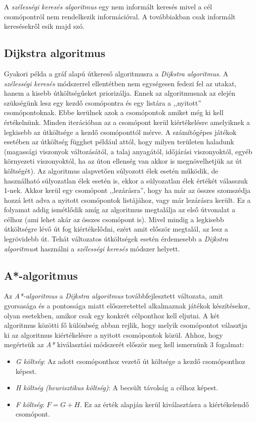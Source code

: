 A \textit{szélességi keresés algoritmus} egy nem informált keresés mivel a cél csomópontról nem rendelkezik információval. A továbbiakban csak informált keresésekről esik majd szó.

\subsection{Dijkstra algoritmus}

Gyakori példa a gráf alapú útkereső algoritmusra a \textit{Dijkstra algoritmus}. A \textit{szélességi keresés} módszerrel ellentétben nem egységesen fedezi fel az utakat, hanem a kisebb útköltségűeket priorizálja. Ennek az algoritmusnak az elején szükségünk lesz egy kezdő csomópontra és egy listára a ,,nyitott'' csomópontoknak. Ebbe kerülnek azok a csomópontok amiket még ki kell értékelnünk. Minden iterációban az a csomópont kerül kiértékelésre amelyiknek a legkisebb az útköltsége a kezdő csomóponttól mérve. A számítógépes játékok esetében az útköltség függhet például attól, hogy milyen területen haladunk (magassági viszonyok változásától, a talaj anyagától, időjárási viszonyoktól, egyéb környezeti viszonyoktól, ha az úton ellenség van akkor is megnövelhetjük az út költségét). Az algoritmus alapvetően súlyozott élek esetén működik, de használható súlyozatlan élek esetén is, ekkor a súlyozatlan élek értékét válasszuk 1-nek. Akkor kerül egy csomópont ,,lezárásra'', hogy ha már az összes szomszédja hozzá lett adva a nyitott csomópontok listájához, vagy már lezárásra került. Ez a folyamat addig ismétlődik amíg az algoritmus megtalálja az első útvonalat a célhoz (ami lehet akár az összes csomópont is). Mivel mindig a legkisebb útköltségre lévő út fog kiértékelődni, ezért amit először megtalál, az lesz a legrövidebb út. Tehát változatos útköltségek esetén érdemesebb a \textit{Dijkstra algoritmus}t használni a \textit{szélességi keresés} módszer helyett.

\subsection{A*-algoritmus}

Az \textit{A*-algoritmus} a \textit{Dijkstra algoritmus} továbbfejlesztett változata, amit gyorsasága és a pontossága miatt előszeretettel alkalmaznak játékok készítésekor, olyan esetekben, amikor csak egy konkrét célponthoz kell eljutni. A két algoritmus közötti fő különbség abban rejlik, hogy melyik csomópontot választja ki az algoritmus kiértékelésre a nyitott csomópontok közül. Ahhoz, hogy megértsük az \textit{A*} kiválasztási módszerét először meg kell ismernünk 3 fogalmat:
\begin{itemize}
\item \textit{G költség}: Az adott csomóponthoz vezető út költsége a kezdő csomóponthoz képest.
\item \textit{H költség (heurisztikus költség)}: A becsült távolság a célhoz képest.
\item \textit{F költség}: $F = G + H$. Ez az érték alapján kerül kiválasztásra a kiértékelendő csomópont.
\end{itemize}

